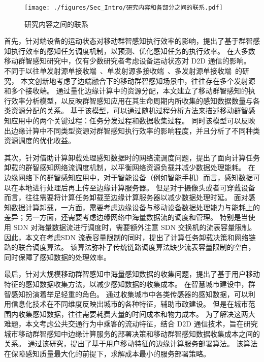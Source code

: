 \begin{figure}[!h]
  \centering
  \texttt{[image: ./figures/Sec\_Intro/研究内容和各部分之间的联系.pdf]}
  \caption{研究内容之间的联系}
  \vspace{-1em}
  \label{Figure_Re_Part}
\end{figure}

首先，针对端设备的运动状态对移动群智感知执行效率的影响，提出了基于群智感知执行效率的感知任务调度机制，以预测、优化感知任务的执行效率。
在大多数移动群智感知研究中，仅有少数研究者考虑设备运动状态对 D2D 通信的影响。
不同于以往单发射源单接收端~\cite{DBLP:journals/twc/LiW14}、单发射源多接收端~\cite{DBLP:conf/wasa/Yan0WWW17}、多发射源单接收端~\cite{DBLP:journals/tpds/ZhaoMTL15}的研究，
本文创新地考虑了边端融合下的移动群智感知场景中，往往存在多个发射源和多个接收端。
通过量化边缘计算中的资源分配，本文建立了移动群智感知的执行效率分析模型，以反映群智感知应用在其生命周期内所收集的感知数据数量与各类资源分配的关系。
基于该模型，可以通过随机过程分析方法来描述移动群智感知应用中的两个关键过程：任务分发过程和数据收集过程。
同时该模型可以反映出边缘计算中不同类型资源对群智感知执行效率的影响程度，并且分析了不同种类资源调度的优化收益。

其次，针对借助计算卸载处理感知数据时的网络流调度问题，提出了面向计算任务卸载的群智感知网络流调度机制，以平衡网络资源负载并减少数据处理能耗。
在边缘网络下的群智感知应用中，对于智能设备（例如智能手机）而言，感知数据可以在本地进行处理后再上传至边缘计算服务器。
但是对于摄像头或者可穿戴设备而言，往往需要将计算任务卸载至边缘计算服务器以减少数据处理时延。
面对感知数据计算卸载，一方面，需要考虑边缘设备与移动设备数据处理能力与能耗上的差异；另一方面，还需要考虑边缘网络中海量数据流的调度和管理。
特别是当使用 SDN 对海量数据流进行调度时，需要额外注意 SDN 交换机的流表容量限制。
因此，本文在考虑SDN 流表容量限制的同时，提出了计算任务卸载决策和网络链路的联合调度算法。
该算法弥补了传统链路调度算法缺少流表容量限制的空白，同时保障了感知数据的处理效率。

最后，针对大规模移动群智感知中海量感知数据的收集问题，提出了基于用户移动特征的感知数据收集方法，以减少感知数据的收集成本。
在智慧城市建设中，群智感知扮演着举足轻重的角色。
通过收集城市中各类传感器的感知数据，可以利用信息化技术在不同维度反映出城市的各种特征，辅助市政建设。
但是在城市范围内收集感知数据，往往需要耗费大量的时间成本和物力成本。
为了解决这两大难题，本文考虑公共交通行为中乘客的流动特征，结合 D2D 通信技术，旨在研究城市移动群智感知中边缘计算服务的部署决策和移动群智感知数据收集成本之间的关系。
通过该研究，提出了基于用户移动特征的边缘计算服务部署算法。
该算法在保障感知质量最大化的前提下，求解成本最小的服务部署策略。


